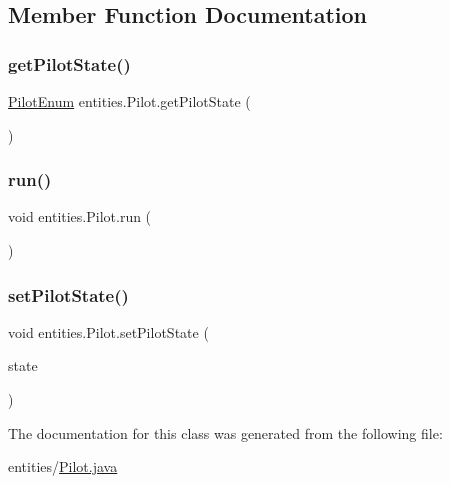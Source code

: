 \subsection{Member Function Documentation}
\mbox{\label{classentities_1_1_pilot_ac16922ae9aa6296ff7adfb1dcfa50d3a}} 
\subsubsection{\texorpdfstring{get\+Pilot\+State()}{getPilotState()}}
{\footnotesize\ttfamily \hyperlink{enumentities_1_1_pilot_enum}{Pilot\+Enum} entities.\+Pilot.\+get\+Pilot\+State (\begin{DoxyParamCaption}{ }\end{DoxyParamCaption})}

\mbox{\label{classentities_1_1_pilot_aa0a1f2dd8931f01b03cdc2aa9e99acaf}} 
\subsubsection{\texorpdfstring{run()}{run()}}
{\footnotesize\ttfamily void entities.\+Pilot.\+run (\begin{DoxyParamCaption}{ }\end{DoxyParamCaption})}

\mbox{\label{classentities_1_1_pilot_a1eb8f6f3fd60fbf50829491b6e263ab9}} 
\subsubsection{\texorpdfstring{set\+Pilot\+State()}{setPilotState()}}
{\footnotesize\ttfamily void entities.\+Pilot.\+set\+Pilot\+State (\begin{DoxyParamCaption}\item[{\hyperlink{enumentities_1_1_pilot_enum}{Pilot\+Enum}}]{state }\end{DoxyParamCaption})}



The documentation for this class was generated from the following file\+:\begin{DoxyCompactItemize}
\item 
entities/\hyperlink{_pilot_8java}{Pilot.\+java}\end{DoxyCompactItemize}
